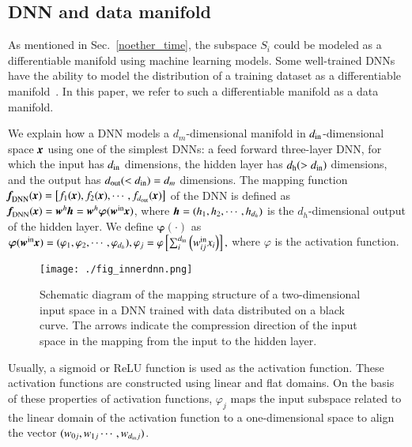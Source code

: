 \documentclass[preprint,
bibnotes,
 amsmath,amssymb,
 aps,
]{revtex4-1}
\begin{document}
\subsection{DNN and data manifold}
\label{sec2}
As mentioned in Sec.~\ref{noether_time}, the subspace $S_i$ could be modeled as a differentiable manifold using machine learning models. 
Some well-trained DNNs have the ability to model the distribution of a training dataset as a differentiable manifold~\cite{Irie_1990,Hinton_Reducing_2006,brahma2016deep,basri2016efficient,Rifai_The_2011,mototakearob}. 
In this paper, we refer to such a differentiable manifold as a data manifold.\par
We explain how a DNN models a $d_{m}$-dimensional manifold in $d_{\rm in}$-dimensional space $\textit{\textbf{x}}$ using one of the simplest DNNs: a feed forward three-layer DNN, for which the input has $d_{\rm in}$ dimensions, the hidden layer has $d_{\rm h}(> d_{\rm in})$ dimensions, and the output has $d_{\rm out}(< d_{\rm in}) = d_m$ dimensions. The mapping function
$\textit{\textbf{f}}_{\rm DNN}(\textit{\textbf{x}})=\left[f_1(\textit{\textbf{x}}),f_2(\textit{\textbf{x}}),\cdots ,f_{d_{\rm out}}(\textit{\textbf{x}})\right]$ of the DNN is defined as $\textit{\textbf{f}}_{\rm DNN}(\textit{\textbf{x}}) =  \textit{\textbf{w}}^{h}\textit{\textbf{h}}
 = \textit{\textbf{w}}^{h}{\boldsymbol \varphi}(\textit{\textbf{w}}^{\rm in}\textit{\textbf{x}})
$, 
where $\textit{\textbf{h}}=(h_{1},h_{2},\cdots ,h_{d_{h}})$ is the $d_{h}$-dimensional output of the hidden layer. 
We define ${\boldsymbol \varphi}(\cdot )$ as
$
{\boldsymbol \varphi}(\textit{\textbf{w}}^{\rm in}\textit{\textbf{x}}) = (\varphi_1,\varphi_2, \cdots, \varphi_{d_{h}}), 
\varphi_j = \varphi\left[\sum_i^{d_{\rm in}} \left(w_{ij}^{\rm in}x_i\right)\right],
$
where $\varphi$ is the activation function. 
\begin{figure}
 \begin{center}
  \texttt{[image: ./fig\_innerdnn.png]}
  \caption{Schematic diagram of the mapping structure of a two-dimensional input space in a DNN trained with data distributed on a black curve. 
The arrows indicate the compression direction of the input space in the mapping from the input to the hidden layer.}
  \label{fig_1}
 \end{center}
\end{figure}
Usually, a sigmoid or ReLU function is used as the activation function. 
These activation functions are constructed using linear and flat domains. 
On the basis of these properties of activation functions, $\varphi_j$ maps the input subspace related to the linear domain of the activation function to a one-dimensional space to align the vector $(w_{0j},w_{1j}\cdots,w_{d_{\rm in}j})$. 
\end{document}
